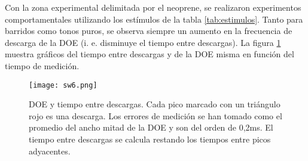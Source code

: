 Con la zona experimental delimitada por el neoprene, se realizaron experimentos comportamentales utilizando los estímulos de la tabla \ref{tab:estimulos}. Tanto para barridos como tonos puros, se observa siempre un aumento en la frecuencia de descarga de la DOE (i. e. disminuye el tiempo entre descargas). La figura \ref{fig:doemiedo} muestra gráficos del tiempo entre descargas y de la DOE misma en función del tiempo de medición.

\begin{figure}[H]
	\centering
		\texttt{[image: sw6.png]}
	\caption{DOE y tiempo entre descargas. Cada pico marcado con un triángulo rojo es una descarga. Los errores de medición se han tomado como el promedio del ancho mitad de la DOE y son del orden de 0,2ms. El tiempo entre descargas se calcula restando los tiempos entre picos adyacentes.}
	\label{fig:doemiedo}
\end{figure}

